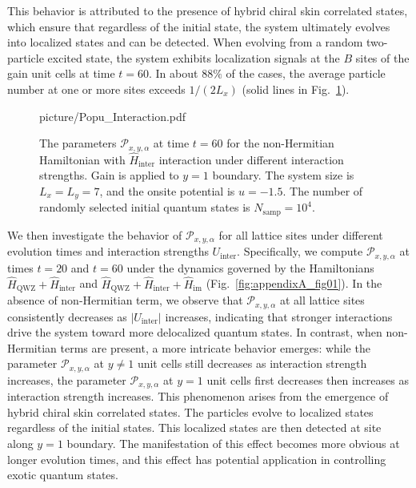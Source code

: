 \documentclass[longbibliography, aps, prx, amsmath, amssymb, amsfonts, twocolumn,superscriptaddress, footinbib]{revtex4-1}
\begin{document}
	This behavior is attributed to the presence of hybrid chiral skin correlated states, which ensure that regardless of the initial state, the system ultimately evolves into localized states and can be detected.
	When evolving from a random two-particle excited state, the system exhibits localization signals at the $B$ sites of the gain unit cells at time $t=60$.
	In about $88\%$ of the cases, the average particle number at one or more sites exceeds $1/(2L_x)$ (solid lines in Fig.~\ref{fig:02_Supple}).
	\begin{figure}[htbp]
		\begin{overpic}[width=0.95\linewidth]{picture/Popu_Interaction.pdf}
		\end{overpic}
		\caption{The parameters $\mathcal{P}_{x,y,\alpha}$ at time $t=60$ for the non-Hermitian Hamiltonian with $\hat{H}_{\text{inter}}$ interaction under different interaction strengths. Gain is applied to $y=1$ boundary. The system size is $L_x=L_y=7$, and the onsite potential is $u=-1.5$. The number of randomly selected initial quantum states is $N_{\text{samp}}=10^4$.}
		\label{fig:02_Supple}
	\end{figure}



	We then investigate the behavior of $\mathcal{P}_{x,y,\alpha}$ for all lattice sites under different evolution times and interaction strengths $U_{\text{inter}}$. Specifically, we compute $\mathcal{P}_{x,y,\alpha}$ at times $t = 20$ and $t = 60$ under the dynamics governed by the Hamiltonians $\hat{H}_{\text{QWZ}} + \hat{H}_{\text{inter}}$ and $\hat{H}_{\text{QWZ}} + \hat{H}_{\text{inter}} + \hat{H}_{\text{im}}$ (Fig.~\ref{fig:appendixA_fig01}). 
	In the absence of non-Hermitian term, we observe that $\mathcal{P}_{x,y,\alpha}$ at all lattice sites consistently decreases as $\lvert U_{\text{inter}} \rvert$ increases, indicating that stronger interactions drive the system toward more delocalized quantum states. 
	In contrast, when non-Hermitian terms are present, a more intricate behavior emerges: while the parameter $\mathcal{P}_{x,y,\alpha}$ at $y\neq 1$ unit cells still decreases as interaction strength increases, 
	the parameter $\mathcal{P}_{x,y,\alpha}$ at $y=1$ unit cells first decreases then increases as interaction strength increases.
	This phenomenon arises from the emergence of hybrid chiral skin correlated states. The particles evolve to localized states regardless of the initial states. This localized states are then detected at site along $y=1$ boundary. The manifestation of this effect becomes more obvious at longer evolution times, and this effect has potential application in controlling exotic quantum states.
\end{document}
